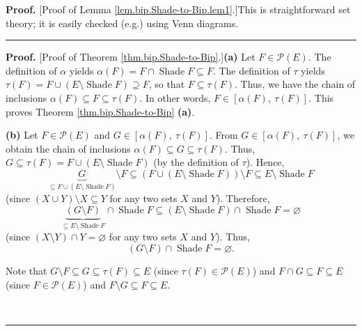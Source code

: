 \documentclass[numbers=enddot,12pt,final,onecolumn]{scrartcl}%
\theoremstyle{definition}
\newenvironment{proof}[1][Proof]{\noindent\textbf{#1.} }{\ \rule{0.5em}{0.5em}}
\begin{document}
\begin{proof}
[Proof of Lemma \ref{lem.bip.Shade-to-Bip.lem1}.]This is straightforward set
theory; it is easily checked (e.g.) using Venn diagrams.
\end{proof}

\begin{proof}
[Proof of Theorem \ref{thm.bip.Shade-to-Bip}.]\textbf{(a)} Let $F\in
\mathcal{P}\left(  E\right)  $. The definition of $\alpha$ yields
$\alpha\left(  F\right)  =F\cap\operatorname*{Shade}F\subseteq F$. The
definition of $\tau$ yields $\tau\left(  F\right)  =F\cup\left(
E\setminus\operatorname*{Shade}F\right)  \supseteq F$, so that $F\subseteq
\tau\left(  F\right)  $. Thus, we have the chain of inclusions $\alpha\left(
F\right)  \subseteq F\subseteq\tau\left(  F\right)  $. In other words,
$F\in\left[  \alpha\left(  F\right)  ,\ \tau\left(  F\right)  \right]  $. This
proves Theorem \ref{thm.bip.Shade-to-Bip} \textbf{(a)}.

\textbf{(b)} Let $F\in\mathcal{P}\left(  E\right)  $ and $G\in\left[
\alpha\left(  F\right)  ,\ \tau\left(  F\right)  \right]  $. From $G\in\left[
\alpha\left(  F\right)  ,\ \tau\left(  F\right)  \right]  $, we obtain the
chain of inclusions $\alpha\left(  F\right)  \subseteq G\subseteq\tau\left(
F\right)  $. Thus, $G\subseteq\tau\left(  F\right)  =F\cup\left(
E\setminus\operatorname*{Shade}F\right)  $ (by the definition of $\tau$).
Hence,
\[
\underbrace{G}_{\subseteq F\cup\left(  E\setminus\operatorname*{Shade}F\right)
}\setminus F\subseteq \left(  F\cup\left(  E\setminus\operatorname*{Shade}F\right)
\right)  \setminus F\subseteq E\setminus\operatorname*{Shade}F
\]
(since $\left(  X\cup Y\right)  \setminus X\subseteq Y$ for any two sets $X$
and $Y$). Therefore,%
\[
\underbrace{\left(  G\setminus F\right)  }_{\subseteq E\setminus
\operatorname*{Shade}F}\cap\operatorname*{Shade}F\subseteq\left(
E\setminus\operatorname*{Shade}F\right)  \cap\operatorname*{Shade}%
F=\varnothing
\]
(since $\left(  X\setminus Y\right)  \cap Y=\varnothing$ for any two sets $X$
and $Y$). Thus,%
\begin{equation}
\left(  G\setminus F\right)  \cap\operatorname*{Shade}F=\varnothing.
\label{pf.thm.bip.Shade-to-Bip.b.1}%
\end{equation}


Note that $G\setminus F\subseteq G\subseteq\tau\left(  F\right)  \subseteq E$
(since $\tau\left(  F\right)  \in\mathcal{P}\left(  E\right)  $) and $F\cap
G\subseteq F\subseteq E$ (since $F\in\mathcal{P}\left(  E\right)  $) and
$F\setminus G\subseteq F\subseteq E$.


\end{proof}
\end{document}
